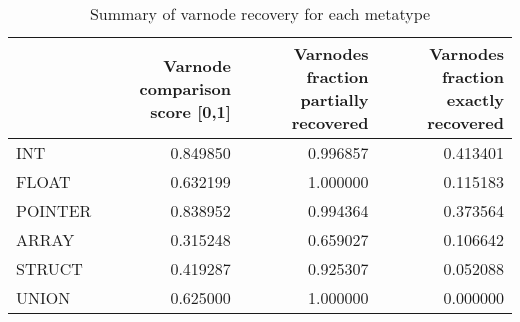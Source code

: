 \begin{table}
\centering
\caption{Summary of varnode recovery for each metatype}
\label{table:metatype-recovery-summary}
\begin{tabular}{lrrr}
\toprule
{} &  Varnode comparison score [0,1] &  Varnodes fraction partially recovered &  Varnodes fraction exactly recovered \\
\midrule
INT     &                        0.849850 &                               0.996857 &                             0.413401 \\
FLOAT   &                        0.632199 &                               1.000000 &                             0.115183 \\
POINTER &                        0.838952 &                               0.994364 &                             0.373564 \\
ARRAY   &                        0.315248 &                               0.659027 &                             0.106642 \\
STRUCT  &                        0.419287 &                               0.925307 &                             0.052088 \\
UNION   &                        0.625000 &                               1.000000 &                             0.000000 \\
\bottomrule
\end{tabular}
\end{table}
